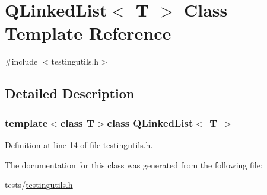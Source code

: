 \hypertarget{classQLinkedList}{\section{Q\+Linked\+List$<$ T $>$ Class Template Reference}
\label{classQLinkedList}
}


{\ttfamily \#include $<$testingutils.\+h$>$}



\subsection{Detailed Description}
\subsubsection*{template$<$class T$>$class Q\+Linked\+List$<$ T $>$}



Definition at line 14 of file testingutils.\+h.



The documentation for this class was generated from the following file\+:\begin{DoxyCompactItemize}
\item 
tests/\hyperlink{testingutils_8h}{testingutils.\+h}\end{DoxyCompactItemize}
